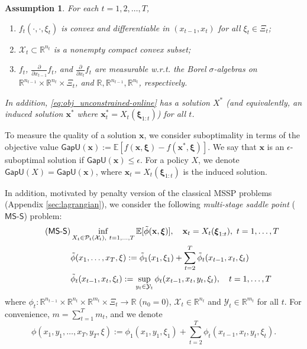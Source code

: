 \documentclass[11pt,fullpage,letterpaper]{article}
\newcommand{\mc}{\mathcal}
\newcommand{\mb}{\mathbf}
\newcommand{\R}{\mathbb{R}}
\newcommand{\E}{\mathbb{E}}
\newcommand{\bx}{\boldsymbol{\xi}}
\newcommand{\gapu}{\mathsf{GapU}}
\newcommand{\mssp}{$\mathsf{MS}$-$\mathsf{S}$}
\newtheorem{assumption}{Assumption}[section]
\begin{document}
\begin{assumption}\label{assu:convex}
    For each $t=1,2,\ldots,T$, 
    \begin{enumerate}
        \item $f_t(\cdot,\cdot,\xi_t)$ is convex and differentiable in $(x_{t-1},x_t)$ for all $\xi_t\in \Xi_t$; 
        \item $\mc X_t\subset \R^{n_t}$ is a nonempty compact convex subset;
        \item $f_t$, $\frac{\partial }{\partial x_{t-1}}f_t$, and $\frac{\partial }{\partial x_{t}}f_t$ are measurable w.r.t. the Borel $\sigma$-algebras on $\R^{n_{t-1}}\times \R^{n_t}\times\Xi_t$, and $\R, \R^{n_{t-1}},\R^{n_t}$, respectively.
    \end{enumerate}
    In addition, \eqref{eq:obj_unconstrained-online} has a solution $X^*$ (and equivalently, an induced solution $\mb x^* $ where $\mb x_t^* = X_t(\bx_{1:t})$) for all $t$. 
\end{assumption}

To measure the quality of a solution $\mb x $, we consider suboptimality in terms of the objective value $\gapu(\mb x):=\E[f(\mb x,\bx)-f(\mb x^*,\bx)]$. We say that $\mb x$ is an $\epsilon$-suboptimal solution if $\gapu(\mb x)\leq \epsilon$. For a policy $X$, we denote $\gapu(X)=\gapu(\mb x)$, where $\mb x_t = X_t(\bx_{1:t})$ is the induced solution. 

In addition, motivated by penalty version of the classical MSSP problems (Appendix \ref{sec:lagrangian}), we consider the following \textit{multi-stage saddle point} (\mssp) problem: 
 \begin{align}\label{eq:minmax-online}\tag{\mssp}
        &\inf_{X_t\in \mc P_t(\mc X_t),~t=1,\ldots,T} \E[\tilde{\phi}(\mb x,\bx)],\quad \mb x_t = X_t(\bx_{1:t}),~t=1,\ldots,T\\
        &\tilde{\phi}(x_1,\ldots,x_T,\xi):= \tilde{\phi}_1(x_1,\xi_1) + \sum_{t=2}^T \tilde{\phi}_{t}(x_{t-1},x_t,\xi_t)\nonumber\\
        &\tilde{\phi}_{t}(x_{t-1},x_t,\xi_t):= \sup_{y_t\in \mc Y_t}\phi_{t}(x_{t-1},x_t,y_t,\xi_t),\quad t = 1,\ldots,T\nonumber
\end{align}
where $\phi_t:\R^{n_{t-1}}\times\R^{n_t}\times \R^{m_t}\times \Xi_t\to \R$ ($n_0 =0$), $\mc X_t \in \R^{n_t}$ and $\mc Y_t\in \R^{m_t}$ for all $t$. For convenience, $m = \sum_{t=1}^T m_t$, and we denote
\begin{displaymath}
    {\phi}(x_1,y_1,\ldots,x_T,y_T,\xi):= {\phi}_1(x_1,y_1,\xi_1) + \sum_{t=2}^T {\phi}_{t}(x_{t-1},x_t,y_t,\xi_t).
\end{displaymath}
\end{document}
